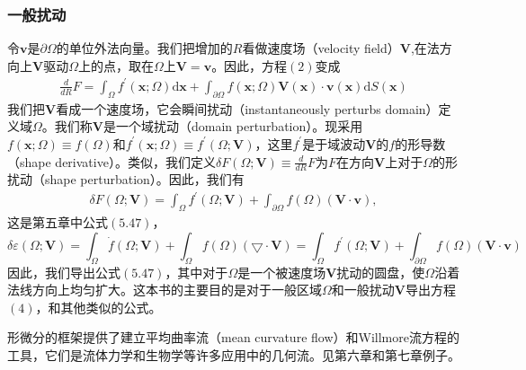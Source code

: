 \documentclass[12pt,a4paper]{article}
\begin{document}
\subsubsection{一般扰动}
令$\boldsymbol{v}$是$\partial \Omega$的单位外法向量。我们把增加的$R$看做速度场（velocity field）$\mathbf{V}$,在法方向上$\mathbf{V}$驱动$\Omega$上的点，取在$\Omega$上$\mathbf{V}=\boldsymbol{v}$。因此，方程$(2)$变成
\begin{gather}
\frac{d}{dR}F=\int_{\Omega}f^{'}(\mathbf{x};\Omega)\mathrm{d}\mathbf{x} + \int_{\partial \Omega}f(\mathbf{x};\Omega)\mathbf{V}(\mathbf{x})\cdot \boldsymbol{v}(\mathbf{x})\mathrm{d}S(\mathbf{x})
\end{gather}
我们把$\mathbf{V}$看成一个速度场，它会瞬间扰动（instantaneously perturbs domain）定义域$\Omega$。我们称$\mathbf{V}$是一个域扰动（domain perturbation）。现采用$f(\mathbf{x};\Omega)\equiv f(\Omega)$和$f^{'}(\mathbf{x};\Omega)\equiv f^{'}(\Omega;\mathbf{V})$，这里$f^{'}$是于域波动$\mathbf{V}$的$f$的形导数（shape derivative）。类似，我们定义$\delta F(\Omega;\mathbf{V})\equiv \frac{d}{dR}F$为$F$在方向$\mathbf{V}$上对于$\Omega$的形扰动（shape perturbation）。因此，我们有
\begin{gather}
\delta F(\Omega;\mathbf{V})=\int_{\Omega}f^{'}(\Omega;\mathbf{V})+\int_{\partial \Omega}f(\Omega)(\mathbf{V} \cdot \boldsymbol{v}),
\end{gather}
这是第五章中公式$(5.47)$，
$$\delta \varepsilon (\Omega;\mathbf{V})=\int_{\Omega}\dot{f}(\Omega;\mathbf{V})+\int_{\Omega}f(\Omega)(\bigtriangledown \cdot \mathbf{V})=\int_{\Omega}f^{'}(\Omega;\mathbf{V})+\int_{\partial \Omega}f(\Omega)(\mathbf{V} \cdot \boldsymbol{v})$$因此，我们导出公式$(5.47)$，其中对于$\Omega$是一个被速度场$\mathbf{V}$扰动的圆盘，使$\Omega$沿着法线方向上均匀扩大。这本书的主要目的是对于一般区域$\Omega$和一般扰动$\mathbf{V}$导出方程$(4)$，和其他类似的公式。

形微分的框架提供了建立平均曲率流（mean curvature flow）和Willmore流方程的工具，它们是流体力学和生物学等许多应用中的几何流。见第六章和第七章例子。








































\cite{tam19912d}
%
\end{document}
